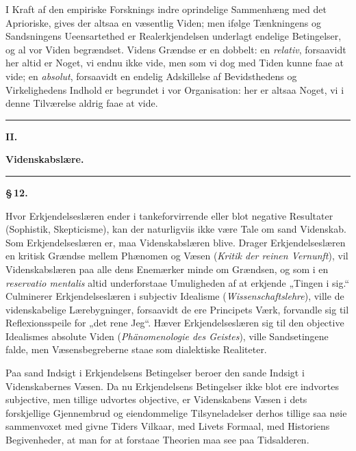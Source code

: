 \documentclass[12pt]{book}
\newcommand{\opage}[1]{\marginnote{\footnotesize\textit{[#1]}}}
\begin{document}
I Kraft af den empiriske Forsknings indre oprindelige Sammenhæng med det Aprioriske,
gives der altsaa en væsentlig Viden; men ifølge Tænkningens og Sandsningens
Ueensartethed er Realerkjendelsen underlagt endelige Betingelser, og al vor Viden
begrændset. Videns Grændse er en dobbelt: en \emph{relativ}, forsaavidt her altid er
Noget, vi endnu ikke vide, men som vi dog med Tiden kunne faae at vide; en
\emph{absolut}, forsaavidt en endelig Adskillelse af Bevidsthedens og Virkelighedens
Indhold er begrundet i vor Organisation: her er altsaa Noget, vi i denne Tilværelse
aldrig faae at vide.

\begin{center}\rule{0.35\linewidth}{0.4pt}\end{center}

\opage{68} \begin{center}
  {\large\bfseries II.}\par\vspace{4pt}
  {\Large\bfseries Videnskabslære.}\par\vspace{4pt}
  \rule{2.5cm}{0.4pt}
\end{center}
{}

\begin{center}{\bfseries \S\,12.}\end{center}

Hvor Erkjendelseslæren ender i tankeforvirrende eller blot negative Resultater
(Sophistik, Skepticisme), kan der naturligviis ikke være Tale om sand Videnskab. Som
Erkjendelseslæren er, maa Videnskabslæren blive. Drager Erkjendelseslæren en kritisk
Grændse mellem Phænomen og Væsen (\textit{Kritik der reinen Vernunft}), vil
Videnskabslæren paa alle dens Enemærker minde om Grændsen, og som i en \textit{reservatio
mentalis} altid underforstaae Umuligheden af at erkjende „Tingen i sig.“ Culminerer
Erkjendelseslæren i subjectiv Idealisme (\textit{Wissenschaftslehre}), ville de
videnskabelige Lærebygninger, forsaavidt de ere Principets Værk, forvandle sig til
Reflexionsspeile for „det rene Jeg“. Hæver Erkjendelseslæren sig til den objective
Idealismes absolute Viden (\textit{Phänomenologie des Geistes}), ville Sandsetingene
falde, men Væsensbegreberne staae som dialektiske Realiteter.

Paa sand Indsigt i Erkjendelsens Betingelser beroer den sande Indsigt i Videnskabernes
Væsen. Da nu Erkjendelsens Betingelser ikke blot ere indvortes subjective, men tillige
udvortes objective, er Videnskabens Væsen i dets forskjellige Gjennembrud og
eiendommelige Tilsyneladelser derhos tillige saa nøie sammenvoxet med givne Tiders
Vilkaar, med Livets Formaal, med Historiens Begivenheder, at man for at forstaae
Theorien maa see paa Tidsalderen.
\end{document}
